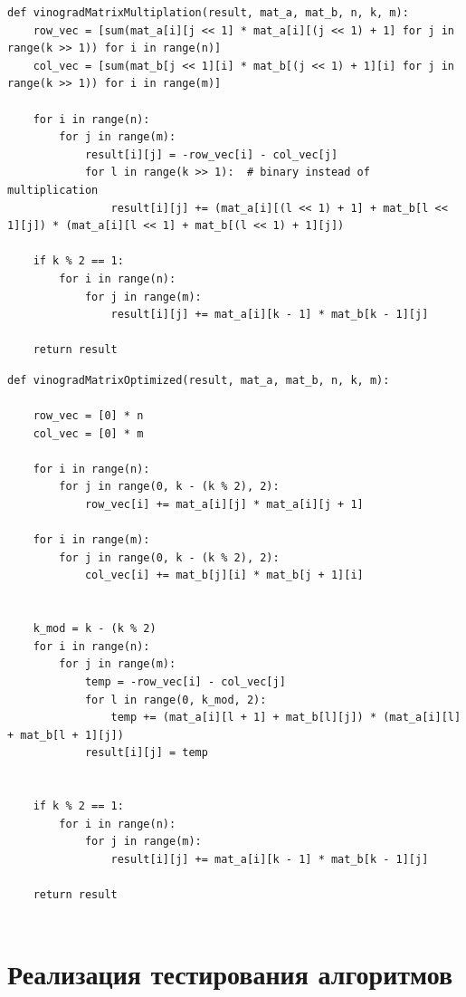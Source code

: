 \begin{lstlisting}[label=some-code-2,caption=Алгоритм Винограда для умножения матриц]
def vinogradMatrixMultiplation(result, mat_a, mat_b, n, k, m):
    row_vec = [sum(mat_a[i][j << 1] * mat_a[i][(j << 1) + 1] for j in range(k >> 1)) for i in range(n)]
    col_vec = [sum(mat_b[j << 1][i] * mat_b[(j << 1) + 1][i] for j in range(k >> 1)) for i in range(m)]

    for i in range(n):
        for j in range(m):
            result[i][j] = -row_vec[i] - col_vec[j]
            for l in range(k >> 1):  # binary instead of multiplication
                result[i][j] += (mat_a[i][(l << 1) + 1] + mat_b[l << 1][j]) * (mat_a[i][l << 1] + mat_b[(l << 1) + 1][j])

    if k % 2 == 1:
        for i in range(n):
            for j in range(m):
                result[i][j] += mat_a[i][k - 1] * mat_b[k - 1][j]

    return result
\end{lstlisting}

\begin{lstlisting}[label=some-code-3,caption=Оптимизированный алгоритм Винограда для умножения матриц]
def vinogradMatrixOptimized(result, mat_a, mat_b, n, k, m):
    
    row_vec = [0] * n
    col_vec = [0] * m

    for i in range(n):
        for j in range(0, k - (k % 2), 2):
            row_vec[i] += mat_a[i][j] * mat_a[i][j + 1]

    for i in range(m):
        for j in range(0, k - (k % 2), 2):
            col_vec[i] += mat_b[j][i] * mat_b[j + 1][i]

    
    k_mod = k - (k % 2)
    for i in range(n):
        for j in range(m):
            temp = -row_vec[i] - col_vec[j]
            for l in range(0, k_mod, 2):
                temp += (mat_a[i][l + 1] + mat_b[l][j]) * (mat_a[i][l] + mat_b[l + 1][j])
            result[i][j] = temp

    
    if k % 2 == 1:
        for i in range(n):
            for j in range(m):
                result[i][j] += mat_a[i][k - 1] * mat_b[k - 1][j]

    return result


\end{lstlisting}

\section{Реализация тестирования алгоритмов}

